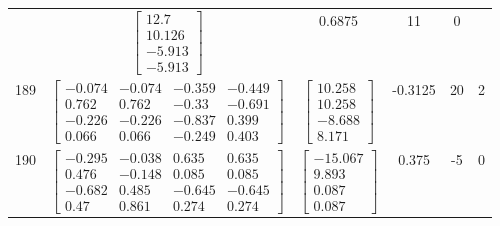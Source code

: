 \documentclass[a4paper,12pt]{article}
\begin{document}
\begin{tabular}{c c c c c c}
&
$\begin{bmatrix} 12.7 \\ 10.126 \\ -5.913 \\ -5.913 \end{bmatrix}$
&
0.6875
&
11
&
0
\\
189
&
$\begin{bmatrix} -0.074 & -0.074 & -0.359 & -0.449 \\ 0.762 & 0.762 & -0.33 & -0.691 \\ -0.226 & -0.226 & -0.837 & 0.399 \\ 0.066 & 0.066 & -0.249 & 0.403 \end{bmatrix}$
&
$\begin{bmatrix} 10.258 \\ 10.258 \\ -8.688 \\ 8.171 \end{bmatrix}$
&
-0.3125
&
20
&
2
\\
190
&
$\begin{bmatrix} -0.295 & -0.038 & 0.635 & 0.635 \\ 0.476 & -0.148 & 0.085 & 0.085 \\ -0.682 & 0.485 & -0.645 & -0.645 \\ 0.47 & 0.861 & 0.274 & 0.274 \end{bmatrix}$
&
$\begin{bmatrix} -15.067 \\ 9.893 \\ 0.087 \\ 0.087 \end{bmatrix}$
&
0.375
&
-5
&
0
\\
\end{tabular} \egroup \newpage
\end{document}
